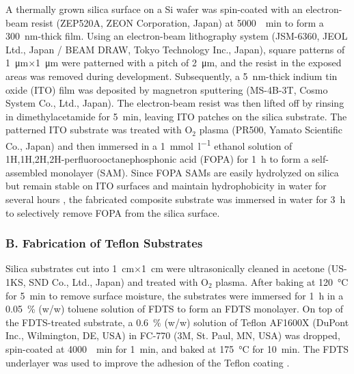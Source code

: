 \documentclass[journal=jacsat,manuscript=article]{achemso}
\begin{document}
A thermally grown silica surface on a Si wafer was spin-coated with an electron-beam resist (ZEP520A, ZEON Corporation, Japan) at \SI{5000}{\per\minute} to form a \SI{300}{\nano\metre}-thick film. Using an electron-beam lithography system (JSM-6360, JEOL Ltd., Japan / BEAM DRAW, Tokyo Technology Inc., Japan), square patterns of \SI{1}{\micro\metre}\(\times\)\SI{1}{\micro\metre} were patterned with a pitch of \SI{2}{\micro\metre}, and the resist in the exposed areas was removed during development. Subsequently, a \SI{5}{\nano\metre}-thick indium tin oxide (ITO) film was deposited by magnetron sputtering (MS-4B-3T, Cosmo System Co., Ltd., Japan). The electron-beam resist was then lifted off by rinsing in dimethylacetamide for \SI{5}{\minute}, leaving ITO patches on the silica substrate. The patterned ITO substrate was treated with \(\mathrm{O}_2\) plasma (PR500, Yamato Scientific Co., Japan) and then immersed in a \SI{1}{\milli\mole\per\litre} ethanol solution of 1H,1H,2H,2H-perfluorooctanephosphonic acid (FOPA) for \SI{1}{\hour} to form a self-assembled monolayer (SAM). Since FOPA SAMs are easily hydrolyzed on silica but remain stable on ITO surfaces and maintain hydrophobicity in water for several hours \cite{Thissen2012-xt, Jo2011-nw}, the fabricated composite substrate was immersed in water for \SI{3}{\hour} to selectively remove FOPA from the silica surface.

\subsubsection{B. Fabrication of Teflon Substrates}

Silica substrates cut into \SI{1}{\centi\metre}\(\times\)\SI{1}{\centi\metre} were ultrasonically cleaned in acetone (US-1KS, SND Co., Ltd., Japan) and treated with \(\mathrm{O}_2\) plasma. After baking at \SI{120}{\degreeCelsius} for \SI{5}{\minute} to remove surface moisture, the substrates were immersed for \SI{1}{\hour} in a \SI{0.05}{\percent} (w/w) toluene solution of FDTS to form an FDTS monolayer. On top of the FDTS-treated substrate, a \SI{0.6}{\percent} (w/w) solution of Teflon AF1600X (DuPont Inc., Wilmington, DE, USA) in FC-770 (3M, St. Paul, MN, USA) was dropped, spin-coated at \SI{4000}{\per\minute} for \SI{1}{\minute}, and baked at \SI{175}{\degreeCelsius} for \SI{10}{\minute}. The FDTS underlayer was used to improve the adhesion of the Teflon coating \cite{Makohliso1998-av}.
\end{document}
